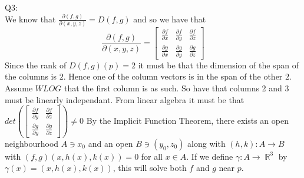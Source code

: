 \documentclass[letterpaper]{article}
\DeclareMathOperator{\R}{\mathbb{R}}
\begin{document}
Q3:\\ We know that $\frac{\partial (f,g)}{\partial (x,y,z)} = D(f,g)$ and so we have that $$\frac{\partial (f,g)}{\partial (x,y,z)} = \begin{bmatrix} \frac{\partial f}{\partial x} & \frac{\partial f}{\partial y} & \frac{\partial f}{\partial z} \\ \frac{\partial g}{\partial x} & \frac{\partial g}{\partial y} & \frac{\partial g}{\partial z}\end{bmatrix}$$
Since the rank of $D(f,g)(p)=2$ it must be that the dimension of the span of the columns is $2$. Hence one of the column vectors is in the span of the other $2$. Assume $WLOG$ that the first column is as such. So have that columns 2 and 3 must be linearly independant. From linear algebra it must be that $ det \left( \begin{bmatrix} \frac{\partial f}{\partial y} & \frac{\partial f}{\partial z} \\ \frac{\partial g}{\partial y} & \frac{\partial g}{\partial z}\end{bmatrix} \right) \neq 0$ 
By the Implicit Function Theorem, there exists an open neighbourhood $A \ni x_0$ and an open $B \ni (y_0,z_0)$ along with $(h,k):A \rightarrow B$ with $(f,g)(x,h(x),k(x))=0$ for all $x\in A$. If we define $\gamma : A \rightarrow \R^3$ by $\gamma(x) = (x,h(x),k(x))$, this will solve both $f$ and $g$ near $p$.  
\end{document}
